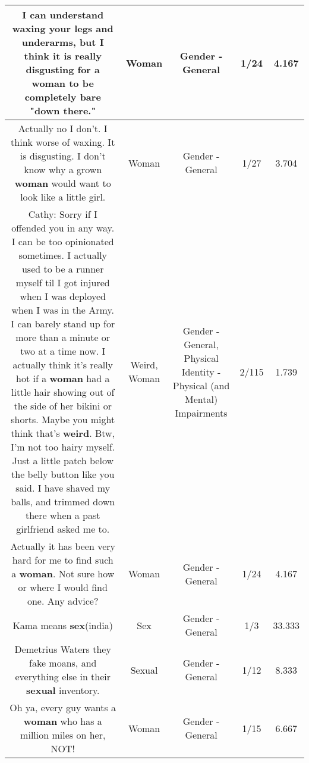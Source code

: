 \documentclass[11pt]{article}
\newlength\mylength
\begin{document}
\begin{center}
\begin{longtable}{|C{.65\mylength}|C{.30\mylength}|C{.12\mylength}|C{.12\mylength}|C{.12\mylength}|}
  \small I can understand waxing your legs and underarms, but I think it is really disgusting for a \textbf{woman} to be completely bare "down there."\normalsize   & Woman & Gender - General & 1/24 & 4.167 \\  \hline
  \small Actually no I don't.  I think worse of waxing.  It is disgusting.  I don't know why a grown \textbf{woman} would want to look like a little girl.\normalsize   & Woman & Gender - General & 1/27 & 3.704 \\  \hline
  \small Cathy:  Sorry if I offended you in any way.  I can be too opinionated sometimes.  I actually used to be a runner myself til I got injured when I was deployed when I was in the Army.  I can barely stand up for more than a minute or two at a time now.  I actually think it's really hot if a \textbf{woman} had a little hair showing out of the side of her bikini or shorts.  Maybe you might think that's \textbf{weird}.  Btw, I'm not too hairy myself.  Just a little patch below the belly button like you said.  I have shaved my balls, and trimmed down there when a past girlfriend asked me to.\normalsize   & Weird, Woman & Gender - General, Physical Identity - Physical (and Mental) Impairments & 2/115 & 1.739 \\  \hline
  \small Actually it has been very hard for me to find such a \textbf{woman}.  Not sure how or where I would find one.  Any advice?\normalsize   & Woman & Gender - General & 1/24 & 4.167 \\  \hline
  \small Kama means \textbf{sex}(india)\normalsize   & Sex & Gender - General & 1/3 & 33.333 \\  \hline
  \small Demetrius Waters   they fake moans, and everything else in their \textbf{sexual} inventory.\normalsize   & Sexual & Gender - General & 1/12 & 8.333 \\  \hline
  \small Oh ya, every guy wants a \textbf{woman} who has a million miles on her, NOT!\normalsize   & Woman & Gender - General & 1/15 & 6.667 \\  \hline

\end{longtable}
\end{center}
\end{document}
